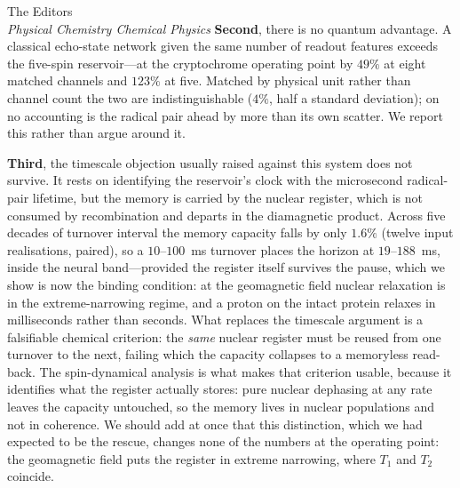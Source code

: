 \documentclass[11pt]{letter}
\begin{document}
\begin{letter}{The Editors\\ \textit{Physical Chemistry Chemical Physics}}
\textbf{Second}, there is no quantum advantage. A classical echo-state network given
the same number of readout features exceeds the five-spin reservoir---at the
cryptochrome operating point by $49\%$ at eight matched channels and $123\%$ at
five. Matched by physical unit rather than channel count the two are
indistinguishable ($4\%$, half a standard deviation); on no accounting is the
radical pair ahead by more than its own scatter. We report this rather than argue around it.

\textbf{Third}, the timescale objection usually raised against this system does not
survive. It rests on identifying the reservoir's clock with the microsecond
radical-pair lifetime, but the memory is carried by the nuclear register, which is
not consumed by recombination and departs in the diamagnetic product. Across five
decades of turnover interval the memory capacity falls by only $1.6\%$
(twelve input realisations, paired), so a $10$--$100$~ms turnover places the
horizon at $19$--$188$~ms, inside the neural band---provided the register itself
survives the pause, which we show is now the binding condition: at the geomagnetic
field nuclear relaxation is in the extreme-narrowing regime, and a proton on the
intact protein relaxes in milliseconds rather than seconds. What replaces the timescale
argument is a falsifiable chemical criterion: the \emph{same} nuclear register must
be reused from one turnover to the next, failing which the capacity collapses to a
memoryless read-back. The spin-dynamical analysis is what makes that criterion
usable, because it identifies what the register actually stores: pure nuclear
dephasing at any rate leaves the capacity untouched, so the memory lives in
nuclear populations and not in coherence. We should add at once that this
distinction, which we had expected to be the rescue, changes none of the numbers
at the operating point: the geomagnetic field puts the register in extreme
narrowing, where $T_1$ and $T_2$ coincide.


\end{letter}
\end{document}
